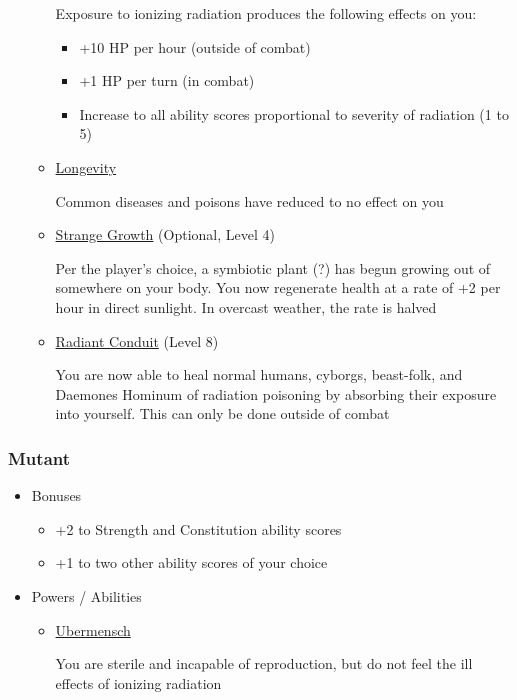 \documentclass[12pt, landscape]{article}
\begin{document}
\begin{FlushLeft}
\begin{multicols}{2}
\begin{itemize}
\begin{itemize}
					Exposure to ionizing radiation produces the following effects on you:
					\begin{itemize}
						\item +10 HP per hour (outside of combat)
						\item +1 HP per turn (in combat)
						\item Increase to all ability scores proportional to severity of radiation (1 to 5)
					\end{itemize}

					\item \underline{Longevity}

					Common diseases and poisons have reduced to no effect on you

					\item \underline{Strange Growth} (Optional, Level 4)

					Per the player’s choice, a symbiotic plant (?) has begun growing out of somewhere on your body. You now regenerate health at a rate of +2 per hour in direct sunlight. In overcast weather, the rate is halved

					\item \underline{Radiant Conduit} (Level 8)

					You are now able to heal normal humans, cyborgs, beast-folk, and Daemones Hominum of radiation poisoning by absorbing their exposure into yourself. This can only be done outside of combat
				\end{itemize}
			\end{itemize}
			\vfill \pagebreak

			\subsubsection{Mutant}
			\begin{itemize}
				\item Bonuses
				\begin{itemize}
					\item +2 to Strength and Constitution ability scores
					\item +1 to two other ability scores of your choice
				\end{itemize}
				\item Powers / Abilities
				\begin{itemize}
					\item \underline{Ubermensch}

					You are sterile and incapable of reproduction, but do not feel the ill effects of ionizing radiation


\end{itemize}
\end{itemize}
\end{multicols}
\end{FlushLeft}
\end{document}
